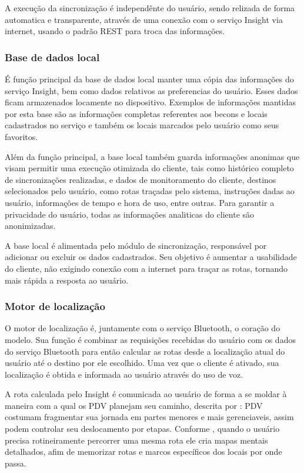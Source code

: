 \documentclass[english,brazilian]{UNISINOSmonografia}
\begin{document}
A execução da sincronização é independênte do usuário, sendo relizada de forma automatica e transparente, através de uma conexão com o serviço Insight via internet, usando o padrão REST para troca das informações.

		\subsubsection{Base de dados local}
É função principal da base de dados local manter uma cópia das informações do serviço Insight, bem como dados relativos as preferencias do usuário. Esses dados ficam armazenados locamente no dispositivo. Exemplos de informações mantidas por esta base são as informações completas referentes aos becons e locais cadastrados no serviço e também os locais marcados pelo usuário como seus favoritos.

Além da função principal, a base local também guarda informações anonimas que visam permitir uma execução otimizada do cliente, tais como histórico completo de sincronizações realizadas, e dados de monitoramento do cliente, destinos selecionados pelo usuário, como rotas traçadas pelo sistema, instruções dadas ao usuário, informações de tempo e hora de uso, entre outras. Para garantir a privacidade do usuário, todas as informações analiticas do cliente são anonimizadas.

A base local é alimentada pelo módulo de sincronização, responsável por adicionar ou excluir os dados cadastrados. Seu objetivo é aumentar a usabilidade do cliente, não exigindo conexão com a internet para traçar as rotas, tornando mais rápida a resposta ao usuário.

		\subsubsection{Motor de localização}
O motor de localização é, juntamente com o serviço Bluetooth, o coração do modelo. Sua função é combinar as requisições recebidas do usuário com os dados do serviço Bluetooth para então calcular as rotas desde a localização atual do usuário até o destino por ele escolhido. Uma vez que o cliente é ativado, sua localização é obtida e informada ao usuário através do uso de voz.

A rota calculada pelo Insight é comunicada ao usuário de forma a se moldar à maneira com a qual os PDV planejam seu caminho, descrita por : PDV costumam fragmentar sua jornada em partes menores e mais gerenciaveis, assim podem controlar seu deslocamento por etapas. Conforme , quando o usuário precisa rotineiramente percorrer uma mesma rota ele cria mapas mentais detalhados, afim de memorizar rotas e marcos específicos dos locais por onde passa. 
\end{document}
